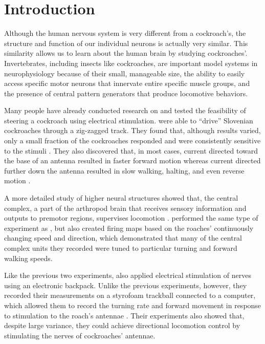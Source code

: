 \section{Introduction}


Although the human nervous system is very different from a cockroach’s, the structure and function of our individual neurons is actually very similar. This similarity allows us to learn about the human brain by studying cockroaches'. Invertebrates, including insects like cockroaches, are important model systems in neurophysiology because of their small, manageable size, the ability to easily access specific motor neurons that innervate entire specific muscle groups, and the presence of central pattern generators that produce locomotive behaviors. 



Many people have already conducted research on and tested the feasibility of steering a cockroach using electrical stimulation. \citet{moore1998directed} were able to ``drive'' Slovenian cockroaches through a zig-zagged track. They found that, although results varied, only a small fraction of the cockroaches responded and were consistently sensitive to the stimuli \citep{moore1998directed}. They also discovered that, in most cases, current directed toward the base of an antenna resulted in faster forward motion whereas current directed further down the antenna resulted in slow walking, halting, and even reverse motion \citep{moore1998directed}.

A more detailed study of higher neural structures showed that, the central complex, a part of the arthropod brain that receives sensory information and outputs to premotor regions, supervises locomotion \citep{guo2013neural}. \citet{guo2013neural} performed the same type of experiment as \citet{moore1998directed}, but also created firing maps based on the roaches' continuously changing speed and direction, which demonstrated that many of the central complex units they recorded were tuned to particular turning and forward walking speeds.

Like the previous two experiments, \citet{holzer1997locomotion} also applied electrical stimulation of nerves using an electronic backpack. Unlike the previous experiments, however, they recorded their measurements on a styrofoam trackball connected to a computer, which allowed them to record the turning rate and forward movement in response to stimulation to the roach's antennae \citep{holzer1997locomotion}. Their experiments also showed that, despite large variance, they could achieve directional locomotion control by stimulating the nerves of cockroaches' antennae.

